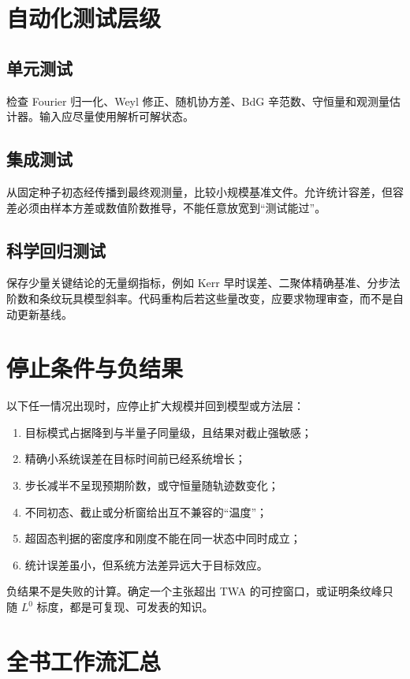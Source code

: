 \section{自动化测试层级}

\subsection{单元测试}

检查 Fourier 归一化、Weyl 修正、随机协方差、BdG 辛范数、守恒量和观测量估计器。输入应尽量使用解析可解状态。

\subsection{集成测试}

从固定种子初态经传播到最终观测量，比较小规模基准文件。允许统计容差，但容差必须由样本方差或数值阶数推导，不能任意放宽到“测试能过”。

\subsection{科学回归测试}

保存少量关键结论的无量纲指标，例如 Kerr 早时误差、二聚体精确基准、分步法阶数和条纹玩具模型斜率。代码重构后若这些量改变，应要求物理审查，而不是自动更新基线。

\section{停止条件与负结果}

以下任一情况出现时，应停止扩大规模并回到模型或方法层：
\begin{enumerate}
  \item 目标模式占据降到与半量子同量级，且结果对截止强敏感；
  \item 精确小系统误差在目标时间前已经系统增长；
  \item 步长减半不呈现预期阶数，或守恒量随轨迹数变化；
  \item 不同初态、截止或分析窗给出互不兼容的“温度”；
  \item 超固态判据的密度序和刚度不能在同一状态中同时成立；
  \item 统计误差虽小，但系统方法差异远大于目标效应。
\end{enumerate}
负结果不是失败的计算。确定一个主张超出 TWA 的可控窗口，或证明条纹峰只随 $L^0$ 标度，都是可复现、可发表的知识。

\section{全书工作流汇总}

